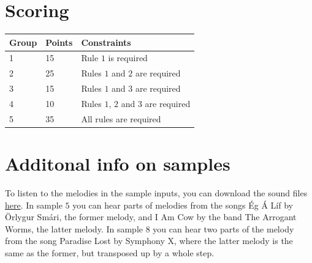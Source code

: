 \section*{Scoring}
\begin{tabular}{|l|l|l|}
\hline
Group & Points & Constraints \\ \hline
1     & 15     & Rule $1$ is required \\ \hline
2     & 25     & Rules $1$ and $2$ are required \\ \hline
3     & 15     & Rules $1$ and $3$ are required \\ \hline
4     & 10     & Rules $1$, $2$ and $3$ are required \\ \hline
5     & 35     & All rules are required \\ \hline
\end{tabular}

\section*{Additonal info on samples}
To listen to the melodies in the sample inputs, you can download the sound files \href{/problems/iceland.logumlog/file/statement/attachments/melodies.zip}{here}.
In sample $5$ you can hear parts of melodies from the songs Ég Á Líf by Örlygur Smári, the former melody, and I Am Cow by the band The Arrogant Worms, the latter melody.
In sample $8$ you can hear two parts of the melody from the song Paradise Lost by Symphony X, where the latter melody is the same as the former, but transposed up by a whole step.

